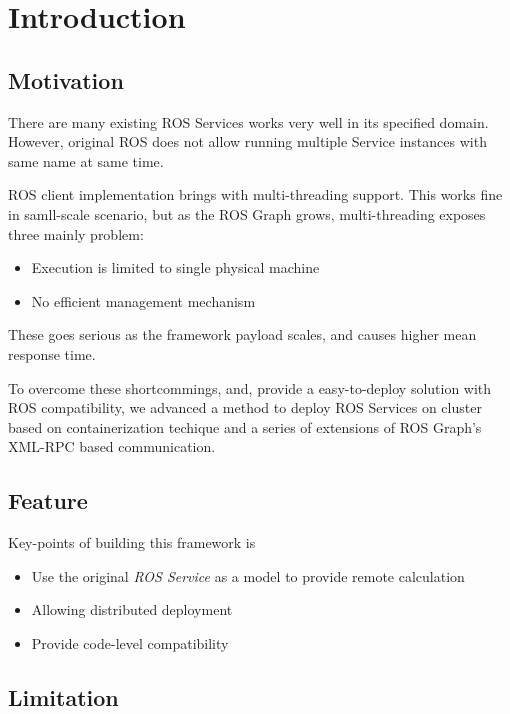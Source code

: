 \section{Introduction}

\subsection{Motivation}

There are many existing ROS Services works very well in its specified domain.
However, original ROS does not allow running multiple Service instances with
same name at same time. 

ROS client implementation brings with multi-threading support. This works fine
in samll-scale scenario, but as the ROS Graph grows, multi-threading exposes
three mainly problem:

\begin{itemize}
    \item Execution is limited to single physical machine
    \item No efficient management mechanism
\end{itemize}

These goes serious as the framework payload scales, and causes higher mean response time.

To overcome these shortcommings, and, provide a easy-to-deploy solution with 
ROS compatibility, we advanced a method to deploy ROS Services on cluster based
on containerization techique and a series of extensions of ROS Graph's XML-RPC based
communication.

\subsection{Feature}

Key-points of building this framework is

\begin{itemize}
    \item Use the original \emph{ROS Service} as a model to provide remote calculation
    \item Allowing distributed deployment
    \item Provide code-level compatibility
\end{itemize}

\subsection{Limitation}

